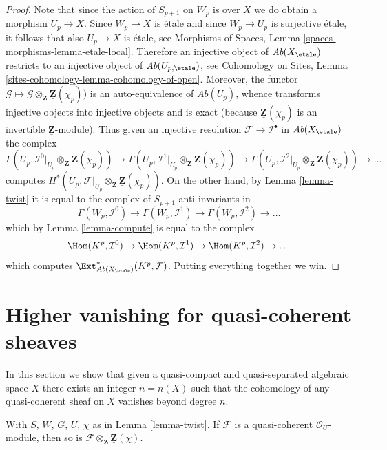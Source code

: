 \begin{proof}
Note that since the action of $S_{p + 1}$ on $W_p$ is over $X$ we do
obtain a morphism $U_p \to X$. Since $W_p \to X$ is \'etale and since
$W_p \to U_p$ is surjective \'etale, it follows
that also $U_p \to X$ is \'etale, see
Morphisms of Spaces, Lemma \ref{spaces-morphisms-lemma-etale-local}.
Therefore an injective object of
$\textit{Ab}(X_\etale)$ restricts to an injective object of
$\textit{Ab}(U_{p, \etale})$, see
Cohomology on Sites, Lemma \ref{sites-cohomology-lemma-cohomology-of-open}.
Moreover, the functor
$\mathcal{G} \mapsto
\mathcal{G} \otimes_\mathbf{Z} \underline{\mathbf{Z}}(\chi_p))$
is an auto-equivalence of $\textit{Ab}(U_p)$, whence transforms injective
objects into injective objects and is exact (because
$\underline{\mathbf{Z}}(\chi_p)$ is an invertible
$\underline{\mathbf{Z}}$-module). Thus given an injective resolution
$\mathcal{F} \to \mathcal{I}^\bullet$ in $\textit{Ab}(X_\etale)$
the complex
$$
\Gamma(U_p,
\mathcal{I}^0|_{U_p} \otimes_\mathbf{Z} \underline{\mathbf{Z}}(\chi_p))
\to
\Gamma(U_p,
\mathcal{I}^1|_{U_p} \otimes_\mathbf{Z} \underline{\mathbf{Z}}(\chi_p))
\to
\Gamma(U_p,
\mathcal{I}^2|_{U_p} \otimes_\mathbf{Z} \underline{\mathbf{Z}}(\chi_p))
\to \ldots
$$
computes
$H^*(U_p,
\mathcal{F}|_{U_p} \otimes_\mathbf{Z} \underline{\mathbf{Z}}(\chi_p))$.
On the other hand, by
Lemma \ref{lemma-twist}
it is equal to the complex of $S_{p + 1}$-anti-invariants in
$$
\Gamma(W_p, \mathcal{I}^0) \to
\Gamma(W_p, \mathcal{I}^1) \to
\Gamma(W_p, \mathcal{I}^2) \to \ldots
$$
which by
Lemma \ref{lemma-compute}
is equal to the complex
$$
\Hom(K^p, \mathcal{I}^0) \to
\Hom(K^p, \mathcal{I}^1) \to
\Hom(K^p, \mathcal{I}^2) \to \ldots
$$
which computes
$\Ext^*_{\textit{Ab}(X_\etale)}(K^p, \mathcal{F})$.
Putting everything together we win.
\end{proof}





\section{Higher vanishing for quasi-coherent sheaves}
\label{section-higher-vanishing}

\noindent
In this section we show that given a quasi-compact and
quasi-separated algebraic space $X$ there exists an integer
$n = n(X)$ such that the cohomology of any quasi-coherent
sheaf on $X$ vanishes beyond degree $n$.

\begin{lemma}
\label{lemma-quasi-coherent-twist}
With $S$, $W$, $G$, $U$, $\chi$ as in
Lemma \ref{lemma-twist}.
If $\mathcal{F}$ is a quasi-coherent $\mathcal{O}_U$-module,
then so is $\mathcal{F} \otimes_{\mathbf{Z}} \underline{\mathbf{Z}}(\chi)$.
\end{lemma}


